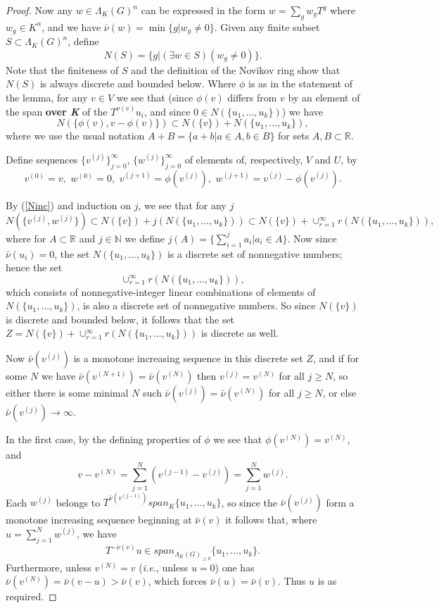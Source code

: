 \documentclass{amsart}
\theoremstyle{plain}
\theoremstyle{definition}
\theoremstyle{remark}
\def\barnu{\bar{\nu}}
\begin{document}
\begin{proof} Now any $w\in \Lambda_K(G)^n$ can be expressed in the form $w=\sum_g w_gT^g$ where $w_g\in K^n$,  and we have $\barnu(w)=\min\{g|w_g\neq 0\}$.  Given any finite subset $S\subset \Lambda_K(G)^n$, define \[ N(S)=\{g|(\exists w\in S)(w_g\neq 0)\}.\]  Note that the finiteness of $S$ and the definition of the Novikov ring show that $N(S)$ is always discrete and bounded below.  Where $\phi$ is as in the statement of the lemma, for any $v\in V$ we see that (since $\phi(v)$ differs from $v$ by an element of the span \textbf{over \textit{K}} of the $T^{\nu(v)}u_i$, and since $0\in N(\{u_1,\ldots,u_k\})$) we have \begin{equation}\label{Ninc} N(\{\phi(v),v-\phi(v)\})\subset N(\{v\})+N(\{u_1,\ldots,u_k\}),\end{equation} where we use the usual notation $A+B=\{a+b|a\in A,b\in B\}$ for sets $A,B\subset\mathbb{R}$.

Define sequences $\{v^{(j)}\}_{j=0}^{\infty}$, $\{w^{(j)}\}_{j=0}^{\infty}$ of elements of, respectively, $V$ and $U$, by \[ v^{(0)}=v, \,\, w^{(0)}=0,\,\, v^{(j+1)}=\phi(v^{(j)}),\,\, w^{(j+1)}=v^{(j)}-\phi(v^{(j)}).\]

By (\ref{Ninc}) and induction on $j$, we see that for any $j$ \[ N(\{v^{(j)},w^{(j)}\})\subset N(\{v\})+j(N(\{u_1,\ldots,u_k\}))\subset N(\{v\})+\cup_{r=1}^{\infty}r(N(\{u_1,\ldots,u_k\})),\] where for $A\subset\mathbb{R}$ and $j\in\mathbb{N}$ we define $j(A)=\{\sum_{i=1}^{j}a_i|a_i\in A\}$.  Now since $\barnu(u_i)= 0$, the set $N(\{u_1,\ldots,u_k\})$ is a discrete set of nonnegative numbers; hence the set \[\cup_{r=1}^{\infty}r(N(\{u_1,\ldots,u_k\})),\] which consists of nonnegative-integer linear combinations of elements of 
$N(\{u_1,\ldots,u_k\})$, is also a discrete set of nonnegative numbers.  So since $N(\{v\})$ is discrete and bounded below, it follows that the set $Z=N(\{v\})+\cup_{r=1}^{\infty}r(N(\{u_1,\ldots,u_k\}))$ is discrete as well.

Now $\barnu(v^{(j)})$ is a monotone increasing sequence in this discrete set $Z$, and if for some $N$ we have $\barnu(v^{(N+1)})=\barnu(v^{(N)})$ then $v^{(j)}=v^{(N)}$ for all $j\geq N$, so either there is some minimal $N$ such $\barnu(v^{(j)})=\barnu(v^{(N)})$ for all $j\geq N$, or else $\barnu(v^{(j)})\to\infty$.

In the first case, by the defining properties of $\phi$ we see that $\phi(v^{(N)})=v^{(N)}$, and \[ v-v^{(N)}=\sum_{j=1}^{N}(v^{(j-1)}-v^{(j)})=\sum_{j=1}^{N}w^{(j)}.\]  Each $w^{(j)}$ belongs to $T^{\barnu(v^{(j-1)})}span_K\{u_1,\ldots,u_k\}$, so since the $\barnu(v^{(j)})$ form a monotone increasing sequence beginning at $\barnu(v)$ it follows that, where $u=\sum_{j=1}^{N}w^{(j)}$, we have  \[ T^{-\barnu(v)}u\in span_{\Lambda_K(G)_{\geq 0}}\{u_1,\ldots,u_k\}.\] Furthermore, unless $v^{(N)}=v$ (\emph{i.e.}, unless $u=0$) one has $\barnu(v^{(N)})=\barnu(v-u)>\barnu(v)$, which forces $\barnu(u)=\barnu(v)$.  Thus $u$ is as required.


\end{proof}
\end{document}
